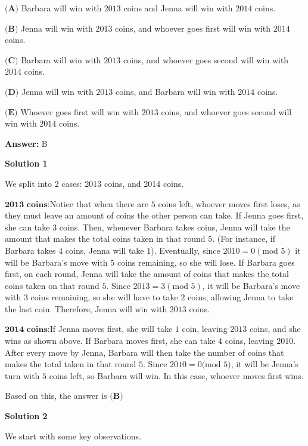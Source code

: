 \begin{enumerate}
 $\textbf{(A)}$ Barbara will win with $2013$ coins and Jenna will win with $2014$ coins. 


 $\textbf{(B)}$ Jenna will win with $2013$ coins, and whoever goes first will win with $2014$ coins. 


 $\textbf{(C)}$ Barbara will win with $2013$ coins, and whoever goes second will win with $2014$ coins.


 $\textbf{(D)}$ Jenna will win with $2013$ coins, and Barbara will win with $2014$ coins.


 $\textbf{(E)}$ Whoever goes first will win with $2013$ coins, and whoever goes second will win with $2014$ coins.


 
 \textbf{Answer: }B



\textbf{Solution 1}

We split into 2 cases: 2013 coins, and 2014 coins.

 $\textbf{2013 coins:}$Notice that when there are $5$ coins left, whoever moves first loses, as they must leave an amount of coins the other person can take. If Jenna goes first, she can take $3$ coins. Then, whenever Barbara takes coins, Jenna will take the amount that makes the total coins taken in that round $5$. (For instance, if Barbara takes $4$ coins, Jenna will take $1$). Eventually, since $2010=0 (\text{mod }5)$ it will be Barbara's move with $5$ coins remaining, so she will lose. If Barbara goes first, on each round, Jenna will take the amount of coins that makes the total coins taken on that round $5$. Since $2013=3 (\text{mod }5)$, it will be Barbara's move with $3$ coins remaining, so she will have to take $2$ coins, allowing Jenna to take the last coin. Therefore, Jenna will win with $2013$ coins.

 $\textbf{2014 coins:}$If Jenna moves first, she will take $1$ coin, leaving $2013$ coins, and she wins as shown above. If Barbara moves first, she can take $4$ coins, leaving $2010$. After every move by Jenna, Barbara will then take the number of coins that makes the total taken in that round $5$. Since $2010=0\text{(mod }5)$, it will be Jenna's turn with $5$ coins left, so Barbara will win. In this case, whoever moves first wins.

 Based on this, the answer is $\boxed{\textbf{(B)}}$




\textbf{Solution 2}

We start with some key observations. 


\end{enumerate}
